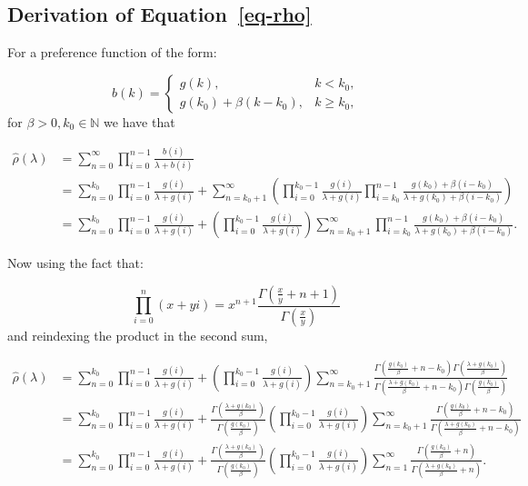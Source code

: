 \documentclass[
  sn-basic,
]{sn-jnl}
\theoremstyle{plain}
\theoremstyle{plain}
\theoremstyle{remark}
\begin{document}
\subsection{\texorpdfstring{Derivation of
Equation~\ref{eq-rho}}{Derivation of Equation~}}\label{derivation-of-eq-rho}

For a preference function of the form:

\[
b(k) = \begin{cases}
g(k),&k<k_0,\\
g(k_0) + \beta(k-k_0), &k\ge k_0,
\end{cases}
\] for \(\beta>0, k_0\in\mathbb N\) we have that

\begin{align*}
\hat\rho(\lambda) &= \sum_{n=0}^\infty\prod_{i=0}^{n-1}\frac{b(i)}{\lambda+b(i)}\\ &= \sum_{n=0}^{k_0}\prod_{i=0}^{n-1}\frac{g(i)}{\lambda+g(i)} + \sum_{n=k_0+1}^\infty\left(\prod_{i=0}^{k_0-1}\frac{g(i)}{\lambda+g(i)}\prod_{i=k_0}^{n-1}\frac{g(k_0) + \beta(i-k_0)}{\lambda +g(k_0) + \beta(i-k_0)}\right)\\
&=\sum_{n=0}^{k_0}\prod_{i=0}^{n-1}\frac{g(i)}{\lambda+g(i)} + \left(\prod_{i=0}^{k_0-1}\frac{g(i)}{\lambda+g(i)}\right)\sum_{n=k_0+1}^\infty\prod_{i=k_0}^{n-1}\frac{g(k_0) + \beta(i-k_0)}{\lambda +g(k_0) + \beta(i-k_0)}.
\end{align*}

Now using the fact that:

\[
\prod_{i=0}^n(x+yi) = x^{n+1}\frac{\Gamma(\frac{x}{y}+n+1)}{\Gamma(\frac{x}{y})}
\] and reindexing the product in the second sum,

\begin{align*}
\hat\rho(\lambda) &= \sum_{n=0}^{k_0}\prod_{i=0}^{n-1}\frac{g(i)}{\lambda+g(i)} + \left(\prod_{i=0}^{k_0-1}\frac{g(i)}{\lambda+g(i)}\right)\sum_{n=k_0+1}^\infty\frac{\Gamma\left(\frac{g(k_0)}{\beta}+n-k_0\right)\Gamma\left(\frac{\lambda+g(k_0)}{\beta}\right)}{\Gamma\left(\frac{\lambda+g(k_0)}{\beta}+n-k_0\right)\Gamma\left(\frac{g(k_0)}{\beta}\right)}\\
&= \sum_{n=0}^{k_0}\prod_{i=0}^{n-1}\frac{g(i)}{\lambda+g(i)} + \frac{\Gamma\left(\frac{\lambda+g(k_0)}{\beta}\right)}{\Gamma\left(\frac{g(k_0)}{\beta}\right)}\left(\prod_{i=0}^{k_0-1}\frac{g(i)}{\lambda+g(i)}\right)\sum_{n=k_0+1}^\infty\frac{\Gamma\left(\frac{g(k_0)}{\beta}+n-k_0\right)}{\Gamma\left(\frac{\lambda+g(k_0)}{\beta}+n-k_0\right)}\\
&=\sum_{n=0}^{k_0}\prod_{i=0}^{n-1}\frac{g(i)}{\lambda+g(i)} + \frac{\Gamma\left(\frac{\lambda+g(k_0)}{\beta}\right)}{\Gamma\left(\frac{g(k_0)}{\beta}\right)}\left(\prod_{i=0}^{k_0-1}\frac{g(i)}{\lambda+g(i)}\right)\sum_{n=1}^\infty\frac{\Gamma\left(\frac{g(k_0)}{\beta}+n\right)}{\Gamma\left(\frac{\lambda+g(k_0)}{\beta}+n\right)}.
\end{align*}
\end{document}
